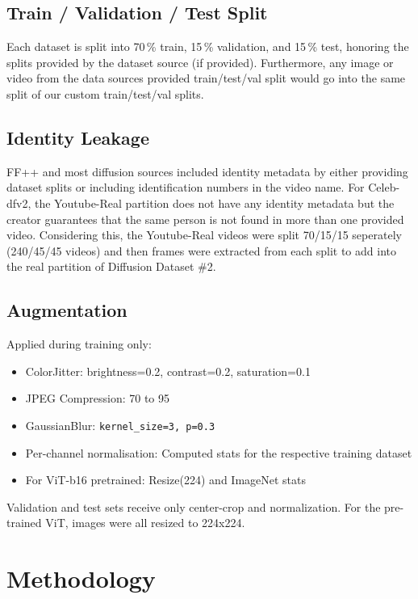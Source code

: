 \documentclass[conference]{IEEEtran}
\begin{document}
\subsection{Train / Validation / Test Split}
Each dataset is split into 70\,\% train, 15\,\% validation, and
15\,\% test, honoring the splits provided by the dataset source (if provided). Furthermore, any image or video from the data sources provided train/test/val split would go into the same split of our custom train/test/val splits. 

\subsection{Identity Leakage}
FF++ and most diffusion sources included identity metadata by either providing dataset splits or including identification numbers in the video name. For Celeb-dfv2, the Youtube-Real partition does not have any identity metadata but the creator guarantees that the same person is not found in more than one provided video. Considering this, the Youtube-Real videos were split 70/15/15 seperately (240/45/45 videos) and then frames were extracted from each split to add into the real partition of Diffusion Dataset \#2.

\subsection{Augmentation}
Applied during training only:
\begin{itemize}
  \item ColorJitter: brightness=0.2, contrast=0.2, saturation=0.1
  \item JPEG Compression: 70 to 95
  \item GaussianBlur: \texttt{kernel\_size=3, p=0.3}
  \item Per-channel normalisation: Computed stats for the respective training dataset
  \item For ViT-b16 pretrained: Resize(224) and ImageNet stats
\end{itemize}
Validation and test sets receive only center-crop and normalization. For the pre-trained ViT, images were all resized to 224x224.

\section{Methodology}
\label{sec:methodology}
\end{document}
